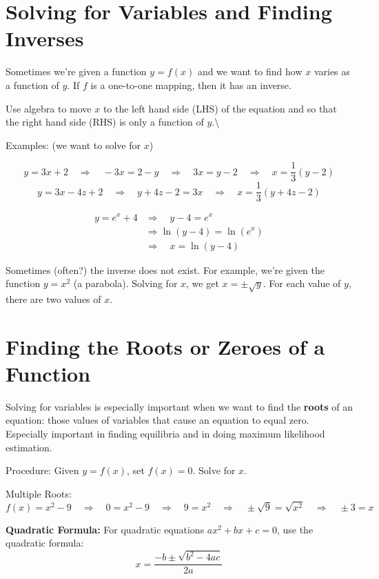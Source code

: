 \documentclass[]{book}
\theoremstyle{definition}
\theoremstyle{definition}
\theoremstyle{definition}
\theoremstyle{remark}
\begin{document}
\section{Solving for Variables and Finding
Inverses}\label{solving-for-variables-and-finding-inverses}

Sometimes we're given a function \(y=f(x)\) and we want to find how
\(x\) varies as a function of \(y\). If \(f\) is a one-to-one mapping,
then it has an inverse.

Use algebra to move \(x\) to the left hand side (LHS) of the equation
and so that the right hand side (RHS) is only a function of
\(y\).\textbackslash{}

Examples: (we want to solve for \(x\))

\[y=3x+2 \quad\Longrightarrow\quad -3x=2-y \quad\Longrightarrow\quad 3x=y-2 \quad\Longrightarrow\quad x=\frac{1}{3}(y-2)\]
\[y=3x-4z+2 \quad \Longrightarrow\quad y+4z-2=3x \quad\Longrightarrow\quad x=\frac{1}{3}(y+4z-2)\]

\begin{align*}
y=e^x+4 &\Longrightarrow\quad y-4=e^x\\
&\Longrightarrow \ln(y-4) = \ln(e^x)\\
&\Longrightarrow\quad x=\ln(y-4)
\end{align*}

Sometimes (often?) the inverse does not exist. For example, we're given
the function \(y=x^2\) (a parabola). Solving for \(x\), we get
\(x=\pm\sqrt{y}\). For each value of \(y\), there are two values of
\(x\).

\section{Finding the Roots or Zeroes of a
Function}\label{finding-the-roots-or-zeroes-of-a-function}

Solving for variables is especially important when we want to find the
\textbf{roots} of an equation: those values of variables that cause an
equation to equal zero. Especially important in finding equilibria and
in doing maximum likelihood estimation.

Procedure: Given \(y=f(x)\), set \(f(x)=0\). Solve for \(x\).

Multiple Roots:
\[f(x)=x^2 - 9 \quad\Longrightarrow\quad 0=x^2 - 9 \quad\Longrightarrow\quad 9=x^2 \quad\Longrightarrow\quad \pm \sqrt{9}=\sqrt{x^2} \quad\Longrightarrow\quad \pm 3=x\]

\textbf{Quadratic Formula:} For quadratic equations \(ax^2+bx+c=0\), use
the quadratic formula: \[x=\frac{-b\pm\sqrt{b^2-4ac}}{2a}\]
\end{document}
